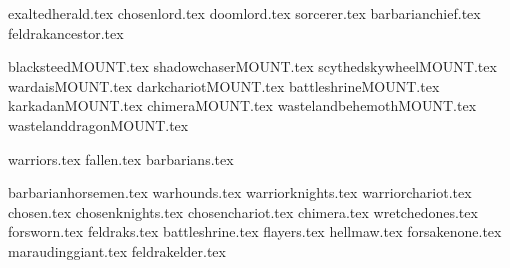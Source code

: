
{exaltedherald.tex}
{chosenlord.tex}
{doomlord.tex}
{sorcerer.tex}
{barbarianchief.tex}
{feldrakancestor.tex}

\clearpage
{}
{blacksteedMOUNT.tex}
{shadowchaserMOUNT.tex}
{scythedskywheelMOUNT.tex}
{wardaisMOUNT.tex}
{darkchariotMOUNT.tex}
{battleshrineMOUNT.tex}
{karkadanMOUNT.tex}
{chimeraMOUNT.tex}
{wastelandbehemothMOUNT.tex}
{wastelanddragonMOUNT.tex}

\clearpage
{}
{warriors.tex}
{fallen.tex}
{barbarians.tex}

\clearpage
{}
{barbarianhorsemen.tex}
{warhounds.tex}
{warriorknights.tex}
{warriorchariot.tex}
{chosen.tex}
{chosenknights.tex}
{chosenchariot.tex}
{chimera.tex}
{wretchedones.tex}
{forsworn.tex}
{feldraks.tex}
{battleshrine.tex}
{flayers.tex}
{hellmaw.tex}
{forsakenone.tex}
{maraudinggiant.tex}
{feldrakelder.tex}
